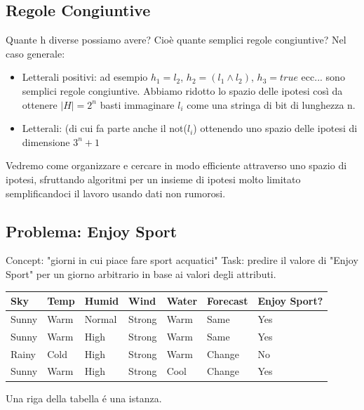 \documentclass{article}
\begin{document}
\subsection{Regole Congiuntive}
Quante h diverse possiamo avere? Cioè quante semplici regole congiuntive? \newline
Nel caso generale:
\begin{itemize}
    \item Letterali positivi: ad esempio $h_1 = l_2$, $h_2=(l_1 \land l_2)$, $h_3 = true$ ecc... sono semplici regole congiuntive. Abbiamo ridotto lo spazio delle ipotesi così da ottenere $|H| = 2^n$ basti immaginare $l_i$ come una stringa di bit di lunghezza n.
    \item Letterali: (di cui fa parte anche il not($l_i$) ottenendo uno spazio delle ipotesi di dimensione $3^n+1$
\end{itemize}
Vedremo come organizzare e cercare in modo efficiente attraverso uno spazio di ipotesi, sfruttando algoritmi per un insieme di ipotesi molto limitato semplificandoci il lavoro usando dati non rumorosi.

\subsection{Problema: Enjoy Sport}
Concept: "giorni in cui piace fare sport acquatici" \newline
Task: predire il valore di "Enjoy Sport" per un giorno arbitrario in base ai valori degli attributi.
\begin{table}[H]
\centering
\begin{tabular}{l|l|l|l|l|l|l}
Sky & Temp & Humid & Wind & Water & Forecast & Enjoy Sport? \\ \hline
Sunny & Warm & Normal & Strong & Warm & Same & Yes \\
Sunny & Warm & High & Strong & Warm & Same & Yes \\
Rainy & Cold & High & Strong & Warm & Change & No \\
Sunny & Warm & High & Strong & Cool & Change & Yes
\end{tabular}
\end{table}
Una riga della tabella é una istanza.
\end{document}
